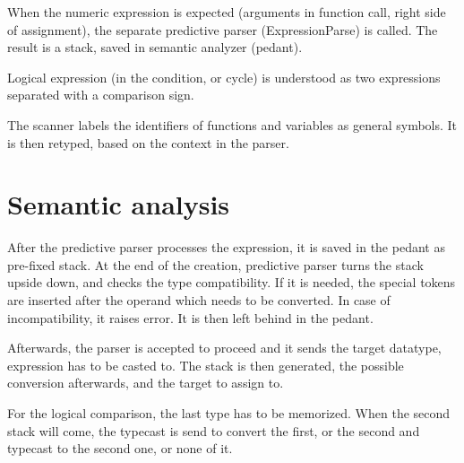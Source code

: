 \documentclass[10pt,a4paper,titlepage]{article}
\begin{document}
\begin{justify}
When the numeric expression is expected (arguments in function call, right
side of assignment), the separate predictive parser (ExpressionParse) is
called. The result is a stack, saved in semantic analyzer (pedant).

Logical expression (in the condition, or cycle) is understood as two
expressions separated with a comparison sign.

The scanner labels the identifiers of functions and variables as general
symbols. It is then retyped, based on the context in the parser.
\end{justify}

\section{Semantic analysis}
\begin{justify}
After the predictive parser processes the expression, it is saved in the
pedant as pre-fixed stack. At the end of the creation, predictive parser turns
the stack upside down, and checks the type compatibility. If it is needed,
the special tokens are inserted after the operand which needs to be converted.
In case of incompatibility, it raises error. It is then left behind in the
pedant.

Afterwards, the parser is accepted to proceed and it sends the target datatype,
expression has to be casted to. The stack is then generated, the possible
conversion afterwards, and the target to assign to.

For the logical comparison, the last type has to be memorized. When the
second stack will come, the typecast is send to convert the first, or the
second and typecast to the second one, or none of it.
\end{justify}
\end{document}
